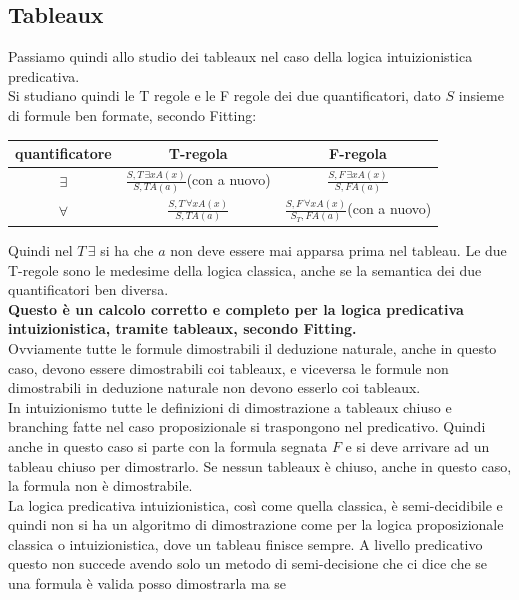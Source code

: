 \documentclass[a4paper,12pt, oneside]{book}
\begin{document}
\subsection{Tableaux}
Passiamo quindi allo studio dei tableaux nel caso della logica intuizionistica
predicativa. \\
Si studiano quindi le T regole e le F regole dei due quantificatori, dato $S$
insieme di formule ben formate, secondo Fitting:
\begin{table}[H]
  \centering
  \Large
  \begin{tabular}{c||c|c}
    quantificatore & T-regola & F-regola\\
    \hline
    $\exists$ & $\frac{S,T\,\exists x A(x)}{S,TA(a)}${\small{(con a nuovo)}}
                              & $\frac{S,F\,\exists x A(x)}{S,FA(a)}$\\
    \hline
    $\forall$ & $\frac{S,T\,\forall x A(x)}{S,TA(a)}$
                              & $\frac{S,F\,\forall x A(x)}{S_T,
                                FA(a)}${\small{(con a nuovo)}}\\
    \hline
  \end{tabular}
\end{table}
Quindi nel $T\,\exists$ si ha che $a$ non deve essere mai apparsa prima nel
tableau. Le due T-regole sono le medesime della logica classica, anche se la
semantica dei due quantificatori ben diversa.\\
\textbf{Questo è un calcolo corretto e completo per la logica predicativa
  intuizionistica, tramite tableaux, secondo Fitting.}\\
Ovviamente tutte le formule dimostrabili il deduzione naturale, anche in questo
caso, devono essere dimostrabili coi tableaux, e viceversa le formule non
dimostrabili in deduzione naturale non devono esserlo coi tableaux.\\
In intuizionismo tutte le definizioni di dimostrazione a tableaux chiuso e
branching fatte nel caso proposizionale si traspongono nel predicativo. Quindi
anche in questo caso si parte con la formula segnata $F$ e si deve arrivare ad
un tableau chiuso per dimostrarlo. Se nessun tableaux è chiuso, anche in questo
caso, la formula non è dimostrabile.\\
La logica predicativa intuizionistica, così come quella classica, è
semi-decidibile e quindi non si ha un algoritmo di dimostrazione come per la
logica proposizionale classica o intuizionistica, dove un tableau finisce
sempre. A livello predicativo questo non succede avendo solo un metodo di
semi-decisione che ci dice che se una formula è valida posso dimostrarla ma se
\end{document}
